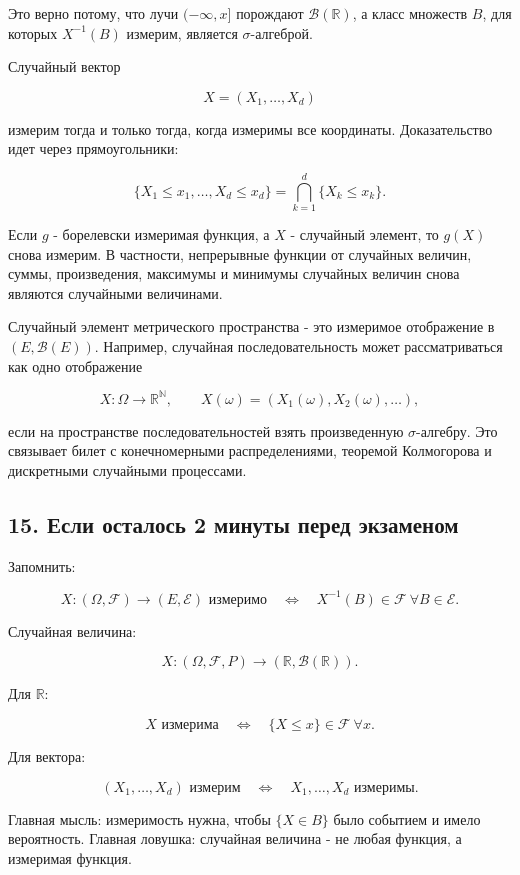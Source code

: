 \documentclass[
  11pt,
  a4paper,
]{article}
\begin{document}
Это верно потому, что лучи \((-\infty,x]\) порождают
\(\mathcal B(\mathbb R)\), а класс множеств \(B\), для которых
\(X^{-1}(B)\) измерим, является \(\sigma\)-алгеброй.

Случайный вектор

\[
X=(X_1,\ldots,X_d)
\]

измерим тогда и только тогда, когда измеримы все координаты.
Доказательство идет через прямоугольники:

\[
\{X_1\le x_1,\ldots,X_d\le x_d\}
=
\bigcap_{k=1}^d\{X_k\le x_k\}.
\]

Если \(g\) - борелевски измеримая функция, а \(X\) - случайный элемент,
то \(g(X)\) снова измерим. В частности, непрерывные функции от случайных
величин, суммы, произведения, максимумы и минимумы случайных величин
снова являются случайными величинами.

Случайный элемент метрического пространства - это измеримое отображение
в \((E,\mathcal B(E))\). Например, случайная последовательность может
рассматриваться как одно отображение

\[
X:\Omega\to\mathbb R^{\mathbb N},
\qquad
X(\omega)=(X_1(\omega),X_2(\omega),\ldots),
\]

если на пространстве последовательностей взять произведенную
\(\sigma\)-алгебру. Это связывает билет с конечномерными
распределениями, теоремой Колмогорова и дискретными случайными
процессами.

\subsection{15. Если осталось 2 минуты перед
экзаменом}\label{ux435ux441ux43bux438-ux43eux441ux442ux430ux43bux43eux441ux44c-2-ux43cux438ux43dux443ux442ux44b-ux43fux435ux440ux435ux434-ux44dux43aux437ux430ux43cux435ux43dux43eux43c}

Запомнить:

\[
X:(\Omega,\mathcal F)\to(E,\mathcal E)
\text{ измеримо}
\quad\Longleftrightarrow\quad
X^{-1}(B)\in\mathcal F\ \forall B\in\mathcal E.
\]

Случайная величина:

\[
X:(\Omega,\mathcal F,P)\to(\mathbb R,\mathcal B(\mathbb R)).
\]

Для \(\mathbb R\):

\[
X\text{ измерима}
\quad\Longleftrightarrow\quad
\{X\le x\}\in\mathcal F\ \forall x.
\]

Для вектора:

\[
(X_1,\ldots,X_d)\text{ измерим}
\quad\Longleftrightarrow\quad
X_1,\ldots,X_d\text{ измеримы}.
\]

Главная мысль: измеримость нужна, чтобы \(\{X\in B\}\) было событием и
имело вероятность. Главная ловушка: случайная величина - не любая
функция, а измеримая функция.

\newpage
\end{document}
